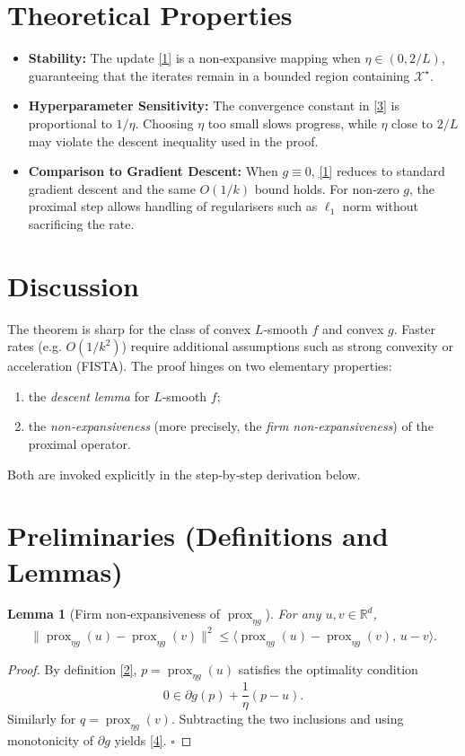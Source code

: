 \documentclass[11pt]{article}
\newtheorem{lemma}{Lemma}
\newcommand{\prox}{\operatorname{prox}}
\newcommand{\R}{\mathbb{R}}
\begin{document}
\section*{Theoretical Properties}
\begin{itemize}
\item \textbf{Stability:} The update \eqref{1} is a non‑expansive mapping when $\eta\in(0,2/L)$, guaranteeing that the iterates remain in a bounded region containing $\mathcal{X}^{\star}$.
\item \textbf{Hyperparameter Sensitivity:} The convergence constant in \eqref{3} is proportional to $1/\eta$. Choosing $\eta$ too small slows progress, while $\eta$ close to $2/L$ may violate the descent inequality used in the proof.
\item \textbf{Comparison to Gradient Descent:} When $g\equiv0$, \eqref{1} reduces to standard gradient descent and the same $O(1/k)$ bound holds. For non‑zero $g$, the proximal step allows handling of regularisers such as $\ell_{1}$ norm without sacrificing the rate.
\end{itemize}

\section*{Discussion}
The theorem is sharp for the class of convex $L$‑smooth $f$ and convex $g$. Faster rates (e.g. $O(1/k^{2})$) require additional assumptions such as strong convexity or acceleration (FISTA). The proof hinges on two elementary properties:
\begin{enumerate}
\item the \emph{descent lemma} for $L$‑smooth $f$;
\item the \emph{non‑expansiveness} (more precisely, the \emph{firm non‑expansiveness}) of the proximal operator.
\end{enumerate}
Both are invoked explicitly in the step‑by‑step derivation below.

\newpage
\section*{Preliminaries (Definitions and Lemmas)}
\begin{lemma}[Firm non‑expansiveness of $\prox_{\eta g}$]\label{lem:firm}
For any $u,v\in\R^{d}$,
\[
\|\prox_{\eta g}(u)-\prox_{\eta g}(v)\|^{2}
\le \langle \prox_{\eta g}(u)-\prox_{\eta g}(v),\,u-v\rangle .
\tag{4}
\]
\end{lemma}
\begin{proof}
By definition \eqref{2}, $p=\prox_{\eta g}(u)$ satisfies the optimality condition  
\[
0\in \partial g(p)+\frac{1}{\eta}(p-u).
\]
Similarly for $q=\prox_{\eta g}(v)$. Subtracting the two inclusions and using monotonicity of $\partial g$ yields \eqref{4}. \hfill $\square$
\end{proof}
\end{document}
